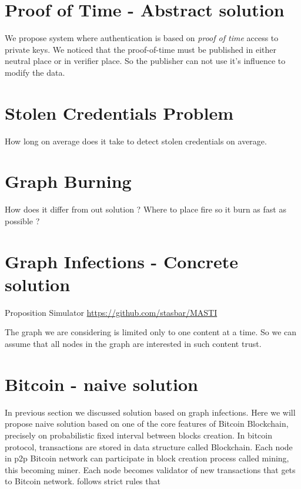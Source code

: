 \documentclass[nostrict]{szablonPG}
\begin{document}
\section{Proof of Time - Abstract solution}
We propose system where authentication is based on \textit{proof of time} access to private keys. 
We noticed that the proof-of-time must be published in either neutral place or in verifier place. So the publisher can not use it's influence to modify the data. 







\section{Stolen Credentials Problem}
How long on average does it take to detect stolen credentials on average.

\section{Graph Burning}
How does it differ from out solution ? Where to place fire so it burn as fast as possible ?


\section{Graph Infections - Concrete solution}
Proposition \cite{jekon2019content}
Simulator \url{https://github.com/stasbar/MASTI}

The graph we are considering is limited only to one content at a time. So we can assume that all nodes in the graph are interested in such content trust.

\section{Bitcoin - naive solution}
In previous section we discussed solution based on graph infections. Here we will propose naive solution based on one of the core features of Bitcoin Blockchain, precisely on probabilistic fixed interval between blocks creation. In bitcoin protocol, transactions are stored in data structure called Blockchain. Each node in p2p Bitcoin network can participate in block creation process called mining, this becoming miner. Each node becomes validator of new transactions that gets to Bitcoin network. follows strict rules that 
\end{document}
